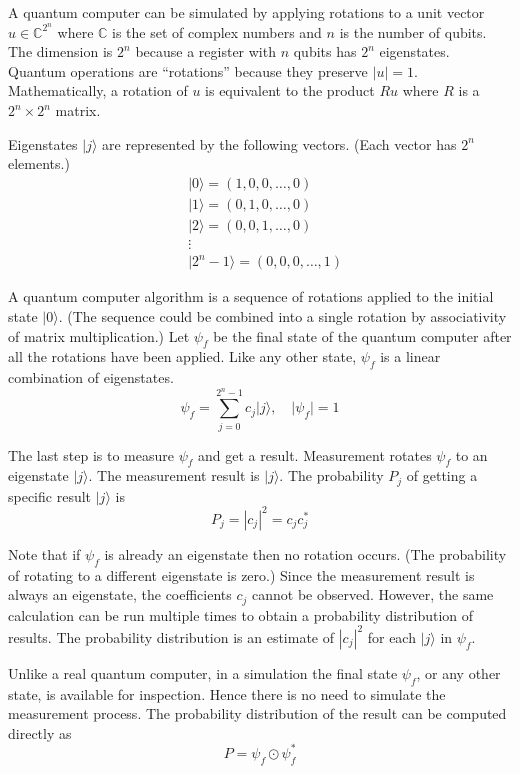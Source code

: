 A quantum computer can be simulated by applying rotations to a
unit vector
$u\in\mathbb{C}^{2^n}$ where $\mathbb{C}$ is the set of complex numbers
and $n$ is the number of qubits.
The dimension is $2^n$ because a register with $n$ qubits
has $2^n$ eigenstates.
Quantum operations are ``rotations'' because they preserve $|u|=1$.
Mathematically, a rotation of $u$ is equivalent to the product $Ru$
where $R$ is a $2^n\times2^n$ matrix.

\bigskip
\noindent
Eigenstates $|j\rangle$ are represented by the following vectors.
(Each vector has $2^n$ elements.)
\begin{align*}
&|0\rangle=(1,0,0,\dots,0)
\\
&|1\rangle=(0,1,0,\ldots,0)
\\
&|2\rangle=(0,0,1,\ldots,0)
\\
&\vdots
\\
&|2^n-1\rangle=(0,0,0,\ldots,1)
\end{align*}

\noindent
A quantum computer algorithm is a sequence of rotations
applied to the initial state $|0\rangle$.
(The sequence could be combined into a single rotation
by associativity of matrix multiplication.)
Let $\psi_f$ be the final state of the quantum computer
after all the rotations have been applied.
Like any other state, $\psi_f$ is a linear combination of eigenstates.
\begin{equation*}
\psi_f=\sum_{j=0}^{2^n-1}c_j|j\rangle,\quad|\psi_f|=1
\end{equation*}

\noindent
The last step is to measure $\psi_f$ and get a result.
Measurement rotates $\psi_f$ to an eigenstate $|j\rangle$.
The measurement result is $|j\rangle$.
The probability $P_j$ of getting a specific result $|j\rangle$ is
\begin{equation*}
P_j=|c_j|^2=c_jc_j^*
\end{equation*}

\noindent
Note that if $\psi_f$ is already an eigenstate then no rotation occurs.
(The probability of rotating to a different eigenstate is zero.)
Since the measurement result is always an eigenstate,
the coefficients $c_j$ cannot be observed.
However, the same calculation can be run multiple times
to obtain a probability distribution of results.
The probability distribution is an estimate
of $|c_j|^2$ for each $|j\rangle$ in $\psi_f$.

\bigskip
\noindent
Unlike a real quantum computer, in a simulation
the final state $\psi_f$, or any other state, is available for inspection.
Hence there is no need to simulate the measurement process.
The probability distribution of the result can be computed directly as
\begin{equation*}
P=\psi_f\odot\psi_f^*
\end{equation*}

